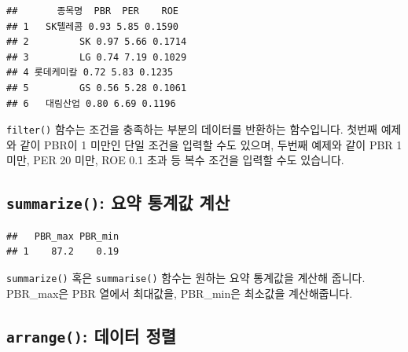 \documentclass[12pt,]{book}
\newenvironment{Shaded}{\begin{snugshade}}{\end{snugshade}}
\newcommand{\DataTypeTok}[1]{\textcolor[rgb]{0.13,0.29,0.53}{#1}}
\newcommand{\DecValTok}[1]{\textcolor[rgb]{0.00,0.00,0.81}{#1}}
\newcommand{\KeywordTok}[1]{\textcolor[rgb]{0.13,0.29,0.53}{\textbf{#1}}}
\newcommand{\NormalTok}[1]{#1}
\newcommand{\OperatorTok}[1]{\textcolor[rgb]{0.81,0.36,0.00}{\textbf{#1}}}
\newcommand{\OtherTok}[1]{\textcolor[rgb]{0.56,0.35,0.01}{#1}}
\newcommand{\StringTok}[1]{\textcolor[rgb]{0.31,0.60,0.02}{#1}}
\begin{document}
\begin{verbatim}
##       종목명  PBR  PER    ROE
## 1   SK텔레콤 0.93 5.85 0.1590
## 2         SK 0.97 5.66 0.1714
## 3         LG 0.74 7.19 0.1029
## 4 롯데케미칼 0.72 5.83 0.1235
## 5         GS 0.56 5.28 0.1061
## 6   대림산업 0.80 6.69 0.1196
\end{verbatim}

\texttt{filter()} 함수는 조건을 충족하는 부분의 데이터를 반환하는 함수입니다. 첫번째 예제와 같이 PBR이 1 미만인 단일 조건을 입력할 수도 있으며, 두번째 예제와 같이 PBR 1 미만, PER 20 미만, ROE 0.1 초과 등 복수 조건을 입력할 수도 있습니다.

\hypertarget{summarize---}{%
\subsection{\texorpdfstring{\texttt{summarize()}: 요약 통계값 계산}{summarize(): 요약 통계값 계산}}\label{summarize---}}

\begin{Shaded}
\end{Shaded}

\begin{verbatim}
##   PBR_max PBR_min
## 1    87.2    0.19
\end{verbatim}

\texttt{summarize()} 혹은 \texttt{summarise()} 함수는 원하는 요약 통계값을 계산해 줍니다. PBR\_max은 PBR 열에서 최대값을, PBR\_min은 최소값을 계산해줍니다.

\hypertarget{arrange--}{%
\subsection{\texorpdfstring{\texttt{arrange()}: 데이터 정렬}{arrange(): 데이터 정렬}}\label{arrange--}}

\begin{Shaded}
\end{Shaded}
\end{document}
